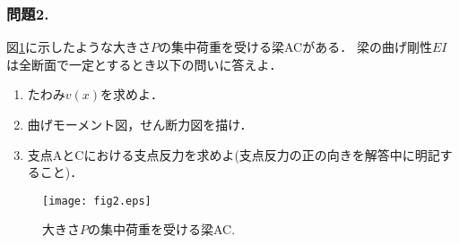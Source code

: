 \documentclass[10pt,a4j]{jarticle}
\begin{document}
\subsubsection*{問題2. }
図\ref{fig:fig2}に示したような大きさ$P$の集中荷重を受ける梁ACがある．
梁の曲げ剛性$EI$は全断面で一定とするとき以下の問いに答えよ．
\begin{enumerate}
\item
	たわみ$v(x)$を求めよ．		
\item
	曲げモーメント図，せん断力図を描け．
\item
	支点AとCにおける支点反力を求めよ(支点反力の正の向きを解答中に明記すること)．
\end{enumerate}
\begin{figure}[h]
	\begin{center}
	\texttt{[image: fig2.eps]} 
	\end{center}
	\vspace{-5mm}
	\caption{大きさ$P$の集中荷重を受ける梁AC.}
	\label{fig:fig2}
\end{figure}
\end{document}
